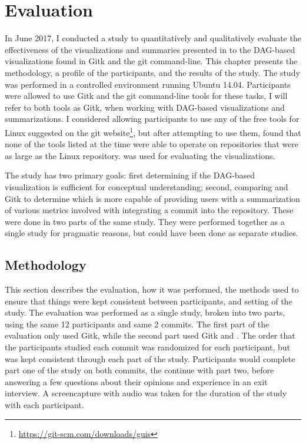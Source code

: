 \chapter{Evaluation}\label{chap:evaluation}

In June 2017, I conducted a study to quantitatively and qualitatively
evaluate the effectiveness of the visualizations and summaries presented
in \tool{} to the DAG-based visualizations found in Gitk and the git
command-line. This chapter presents the methodology, a profile of the
participants, and the results of the study. The study was performed in a
controlled environment running Ubuntu 14.04. Participants were allowed
to use Gitk and the git command-line tools for these tasks, I will refer
to both tools as Gitk, when working with DAG-based visualizations and
summarizations.
I considered allowing participants to use any of the
free tools for Linux suggested on the git
website\footnote{\url{https://git-scm.com/downloads/guis}}, but
after attempting to use them, found that none of the tools listed at
the time were able to operate on repositories that were as large as
the Linux repository.
\tool{} was used for evaluating the  visualizations.

The study has two primary goals: first determining if the DAG-based
visualization is sufficient for conceptual understanding; second,
comparing \tool and Gitk to determine which is more capable of providing
users with a summarization of various metrics involved with integrating
a commit into the repository. These were done in two parts of the same
study. They were performed together as a single study for pragmatic
reasons, but could have been done as separate studies.

\section{Methodology}\label{sec:methodology}

This section describes the evaluation, how it was performed, the methods
used to ensure that things were kept consistent between participants,
and setting of the study. The evaluation was performed as a single
study, broken into two parts, using the same 12 participants and same 2
commits. The first part of the evaluation only used Gitk, while the
second part used Gitk and \tool{}. The order that the participants
studied each commit was randomized for each participant, but was kept
consistent through each part of the study. Participants would complete
part one of the study on both commits, the continue with part two, before
answering a few questions about their opinions and experience in an exit
interview. A screencapture with audio was taken for the duration of the
study with each participant.

